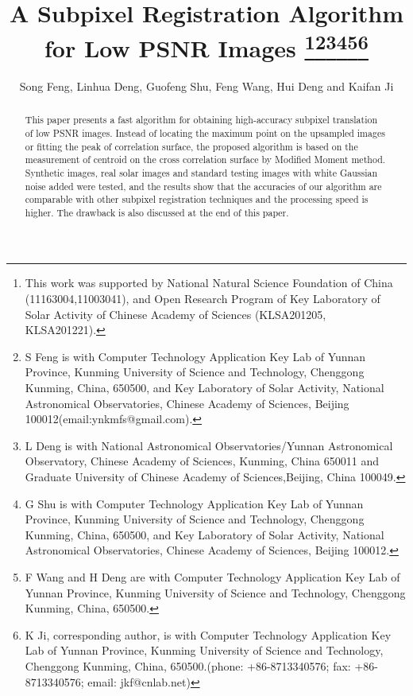 \documentclass[conference]{IEEEtran}
\begin{document}
\title{\ \\ \LARGE\bf A Subpixel Registration Algorithm for Low PSNR Images \thanks{This work was supported by National Natural Science Foundation of China (11163004,11003041), and Open Research Program of Key Laboratory of Solar Activity of Chinese Academy of Sciences (KLSA201205, KLSA201221).}\thanks{
S Feng is with  Computer Technology Application Key Lab of Yunnan Province, Kunming University of Science and Technology, Chenggong Kunming, China, 650500, and Key Laboratory of Solar Activity, National Astronomical Observatories, Chinese Academy of Sciences, Beijing 100012(email:ynkmfs@gmail.com). }\thanks{ L Deng is with National Astronomical Observatories/Yunnan Astronomical Observatory, Chinese Academy of Sciences, Kunming, China 650011 and Graduate University of Chinese Academy of Sciences,Beijing, China 100049.}\thanks{ G Shu is with  Computer Technology Application Key Lab of Yunnan Province, Kunming University of Science and Technology, Chenggong Kunming, China, 650500, and Key Laboratory of Solar Activity, National Astronomical Observatories, Chinese Academy of Sciences, Beijing 100012.}\thanks{F Wang and H Deng are with Computer Technology Application Key Lab of Yunnan Province, Kunming University of Science and Technology, Chenggong Kunming, China, 650500.}\thanks{K Ji, corresponding author, is with Computer Technology Application Key Lab of Yunnan Province, Kunming University of Science and Technology, Chenggong Kunming, China, 650500.(phone: +86-8713340576; fax: +86-8713340576; email: jkf@cnlab.net) }}

\author{Song Feng, Linhua Deng, Guofeng Shu, Feng Wang, Hui Deng and Kaifan Ji}


\maketitle

\begin{abstract}
This paper presents a fast algorithm for obtaining high-accuracy subpixel translation of low PSNR images. Instead of locating the maximum point on the upsampled images or fitting the peak of correlation surface, the proposed algorithm is based on the measurement of centroid on the cross correlation surface by Modified Moment method. Synthetic images, real solar images and standard testing images with white Gaussian noise added were tested, and the results show that the accuracies of our algorithm are comparable with other subpixel registration techniques and the processing speed is higher. The drawback is also discussed at the end of this paper.
\end{abstract}
\end{document}
